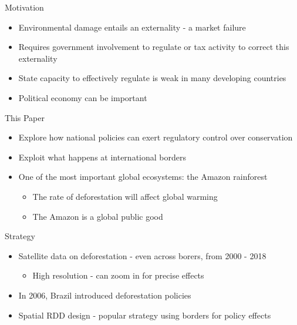 \documentclass[11pt,notes=hide,aspectratio=169,mathserif]{beamer}
\begin{document}
\begin{frame}{Motivation}
\begin{itemize}
\item Environmental damage entails an externality - a market failure 
\item Requires government involvement to regulate or tax activity to correct this externality
\item State capacity to effectively regulate is weak in many developing countries
\item Political economy can be important 
\end{itemize}
\end{frame}

\begin{frame}{This Paper}
\begin{itemize}
\item Explore how national policies can exert regulatory control over conservation 
\item Exploit what happens at international borders 
\item One of the most important global ecosystems: the Amazon rainforest
\begin{itemize}
    \item The rate of deforestation will affect global warming
    \item The Amazon is a global public good
\end{itemize}
\end{itemize}
\end{frame}

\begin{frame}{Strategy}
\begin{itemize}
\item Satellite data on deforestation - even across borers, from 2000 - 2018 
\begin{itemize}
\item High resolution - can zoom in for precise effects 
\end{itemize}
\item In 2006, Brazil introduced deforestation policies
\item Spatial RDD design - popular strategy using borders for policy effects
\end{itemize}
\end{frame}
\end{document}
